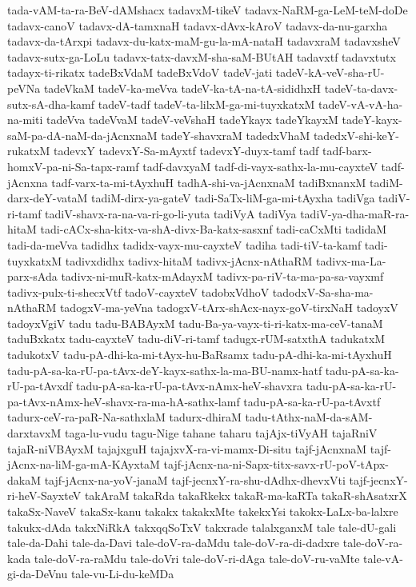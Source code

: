 {tada-vAM-ta-ra-BeV-dAMshacx
tadavxM-tikeV
tadavx-NaRM-ga-LeM-teM-doDe
tadavx-canoV
tadavx-dA-tamxnaH
tadavx-dAvx-kAroV
tadavx-da-nu-garxha
tadavx-da-tArxpi
tadavx-du-katx-maM-gu-la-mA-nataH
tadavxraM
tadavxsheV
tadavx-sutx-ga-LoLu
tadavx-tatx-davxM-sha-saM-BUtAH
tadavxtf
tadavxtutx
tadayx-ti-rikatx
tadeBxVdaM
tadeBxVdoV
tadeV-jati
tadeV-kA-veV-sha-rU-peVNa
tadeVkaM
tadeV-ka-meVva
tadeV-ka-tA-na-tA-sididhxH
tadeV-ta-davx-sutx-sA-dha-kamf
tadeV-tadf
tadeV-ta-lilxM-ga-mi-tuyxkatxM
tadeV-vA-vA-ha-na-miti
tadeVva
tadeVvaM
tadeV-veVshaH
tadeYkayx
tadeYkayxM
tadeY-kayx-saM-pa-dA-naM-da-jAcnxnaM
tadeY-shavxraM
tadedxVhaM
tadedxV-shi-keY-rukatxM
tadevxY
tadevxY-Sa-mAyxtf
tadevxY-duyx-tamf
tadf
tadf-barx-homxV-pa-ni-Sa-tapx-ramf
tadf-davxyaM
tadf-di-vayx-sathx-la-mu-cayxteV
tadf-jAcnxna
tadf-varx-ta-mi-tAyxhuH
tadhA-shi-va-jAcnxnaM
tadiBxnanxM
tadiM-darx-deY-vataM
tadiM-dirx-ya-gateV
tadi-SaTx-liM-ga-mi-tAyxha
tadiVga
tadiV-ri-tamf
tadiV-shavx-ra-na-va-ri-go-li-yuta
tadiVyA
tadiVya
tadiV-ya-dha-maR-ra-hitaM
tadi-cACx-sha-kitx-va-shA-divx-Ba-katx-sasxnf
tadi-caCxMti
tadidaM
tadi-da-meVva
tadidhx
tadidx-vayx-mu-cayxteV
tadiha
tadi-tiV-ta-kamf
tadi-tuyxkatxM
tadivxdidhx
tadivx-hitaM
tadivx-jAcnx-nAthaRM
tadivx-ma-La-parx-sAda
tadivx-ni-muR-katx-mAdayxM
tadivx-pa-riV-ta-ma-pa-sa-vayxmf
tadivx-pulx-ti-shecxVtf
tadoV-cayxteV
tadobxVdhoV
tadodxV-Sa-sha-ma-nAthaRM
tadogxV-ma-yeVna
tadogxV-tArx-shAcx-nayx-goV-tirxNaH
tadoyxV
tadoyxVgiV
tadu
tadu-BABAyxM
tadu-Ba-ya-vayx-ti-ri-katx-ma-ceV-tanaM
taduBxkatx
tadu-cayxteV
tadu-diV-ri-tamf
tadugx-rUM-satxthA
tadukatxM
tadukotxV
tadu-pA-dhi-ka-mi-tAyx-hu-BaRsamx
tadu-pA-dhi-ka-mi-tAyxhuH
tadu-pA-sa-ka-rU-pa-tAvx-deY-kayx-sathx-la-ma-BU-namx-hatf
tadu-pA-sa-ka-rU-pa-tAvxdf
tadu-pA-sa-ka-rU-pa-tAvx-nAmx-heV-shavxra
tadu-pA-sa-ka-rU-pa-tAvx-nAmx-heV-shavx-ra-ma-hA-sathx-lamf
tadu-pA-sa-ka-rU-pa-tAvxtf
tadurx-ceV-ra-paR-Na-sathxlaM
tadurx-dhiraM
tadu-tAthx-naM-da-sAM-darxtavxM
taga-lu-vudu
tagu-Nige
tahane
taharu
tajAjx-tiVyAH
tajaRniV
tajaR-niVBAyxM
tajajxguH
tajajxvX-ra-vi-mamx-Di-situ
tajf-jAcnxnaM
tajf-jAcnx-na-liM-ga-mA-KAyxtaM
tajf-jAcnx-na-ni-Sapx-titx-savx-rU-poV-tApx-dakaM
tajf-jAcnx-na-yoV-janaM
tajf-jecnxY-ra-shu-dAdhx-dhevxVti
tajf-jecnxY-ri-heV-SayxteV
takAraM
takaRda
takaRkekx
takaR-ma-kaRTa
takaR-shAsatxrX
takaSx-NaveV
takaSx-kanu
takakx
takakxMte
takekxYsi
takokx-LaLx-ba-lalxre
takukx-dAda
takxNiRkA
takxqqSoTxV
takxrade
talalxganxM
tale
tale-dU-gali
tale-da-Dahi
tale-da-Davi
tale-doV-ra-daMdu
tale-doV-ra-di-dadxre
tale-doV-ra-kada
tale-doV-ra-raMdu
tale-doVri
tale-doV-ri-dAga
tale-doV-ru-vaMte
tale-vA-gi-da-DeVnu
tale-vu-Li-du-keMDa
}
